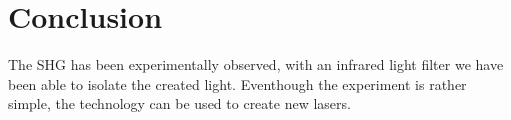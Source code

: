 \section{Conclusion}
\label{sec:conclusion}
The SHG has been experimentally observed, with an infrared light filter we have been able to isolate
the created light. Eventhough the experiment is rather simple, the technology can be used to create
new lasers.

